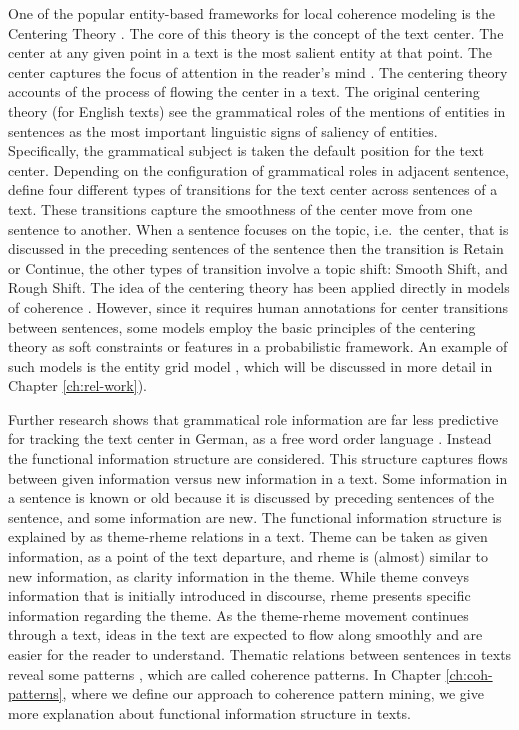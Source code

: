 One of the popular entity-based frameworks for local coherence modeling is the Centering Theory \cite{grosz95}. 
The core of this theory is the concept of the text center. 
The center at any given point in a text is the most salient entity at that point.   
The center captures the focus of attention in the reader's mind \cite{grosz95}.
The centering theory accounts of the process of flowing the center in a text. 
The original centering theory (for English texts) see the grammatical roles of the mentions of entities in sentences as the most important linguistic signs of saliency of entities. 
Specifically, the grammatical subject is taken the default position for the text center. 
Depending on the configuration of grammatical roles in adjacent sentence,  define four different types of transitions for the text center across sentences of a text. 
These transitions capture the smoothness of the center move from one sentence to another. 
When a sentence focuses on the topic, i.e.\ the center, that is discussed in the preceding sentences of the sentence then the transition is Retain or Continue, the other types of transition involve a topic shift: Smooth Shift, and Rough Shift. 
The idea of the centering theory has been applied directly in models of coherence \cite{karamanis04a}.  
However, since it requires human annotations for center transitions between sentences, some models employ the basic principles of the centering theory as soft constraints or features in a probabilistic framework. 
An example of such models is the entity grid model \cite{barzilay05a,barzilay08} , which will be discussed in more detail in Chapter \ref{ch:rel-work}).

Further research shows that grammatical role information are far less predictive for tracking the text center in German, as a free word order language \cite{strube.acl96}. 
Instead the functional information structure \cite{danes74} are considered. 
This structure captures flows between given information versus new information in a text. 
Some information in a sentence is known or old because it is discussed by preceding sentences of the sentence, and some information are new. 
The functional information structure is explained by  as theme-rheme relations in a text. 
Theme can be taken as given information, as a point of the text departure, and rheme is (almost) similar to new information, as clarity information in the theme. 
While theme conveys information that is initially introduced in discourse, rheme presents specific 
information regarding the theme. 
As the theme-rheme movement continues through a text, ideas in the text are expected to flow along smoothly and are easier for the reader to understand. 
Thematic relations between sentences in texts reveal some patterns \cite{danes74}, which are called  coherence patterns.
In Chapter \ref{ch:coh-patterns}, where we define our approach to coherence pattern mining, we give more explanation about functional information structure \cite{danes74} in texts. 


